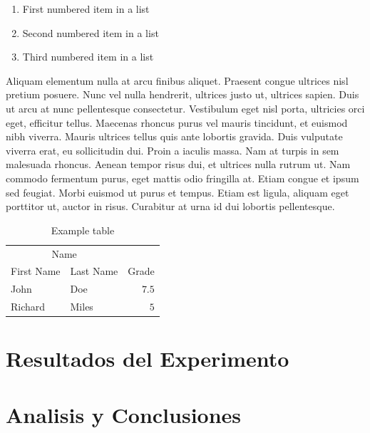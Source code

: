 \documentclass[10pt, a4paper]{article}%
\begin{document}
\begin{multicols}{2}
\begin{enumerate}
	\item First numbered item in a list
	\item Second numbered item in a list
	\item Third numbered item in a list
\end{enumerate}

Aliquam elementum nulla at arcu finibus aliquet. Praesent congue ultrices nisl pretium posuere. Nunc vel nulla hendrerit, ultrices justo ut, ultrices sapien. Duis ut arcu at nunc pellentesque consectetur. Vestibulum eget nisl porta, ultricies orci eget, efficitur tellus. Maecenas rhoncus purus vel mauris tincidunt, et euismod nibh viverra. Mauris ultrices tellus quis ante lobortis gravida. Duis vulputate viverra erat, eu sollicitudin dui. Proin a iaculis massa. Nam at turpis in sem malesuada rhoncus. Aenean tempor risus dui, et ultrices nulla rutrum ut. Nam commodo fermentum purus, eget mattis odio fringilla at. Etiam congue et ipsum sed feugiat. Morbi euismod ut purus et tempus. Etiam est ligula, aliquam eget porttitor ut, auctor in risus. Curabitur at urna id dui lobortis pellentesque.

\begin{table}
	\caption{Example table}
	\centering
	\begin{tabular}{llr}
		\toprule
		\multicolumn{2}{c}{Name} \\
		\cmidrule(r){1-2}
		First Name & Last Name & Grade \\
		\midrule
		John & Doe & $7.5$ \\
		Richard & Miles & $5$ \\
		\bottomrule
	\end{tabular}
\end{table}


\section{Resultados del Experimento}

\section{Analisis y Conclusiones}


\end{multicols}
\end{document}
